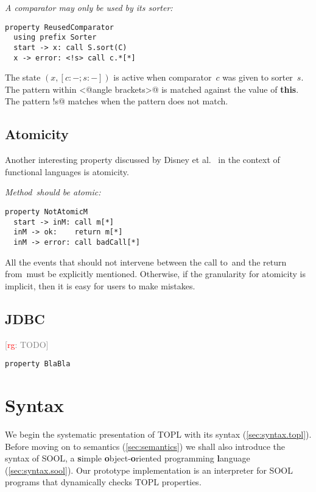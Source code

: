 \documentclass[preprint]{sigplanconf} %
\newcommand{\note}[2]{\textcolor{gray}{[\textcolor{red}{#1}: #2]}}
\newcommand{\rg}[1]{\note{rg}{#1}}
\newcommand{\delimitVerbatim}{\par\nobreak\smallskip\noindent}
\theoremstyle{definition}
\theoremstyle{remark}
\begin{document}
\medskip\emph{A comparator may only be used by its sorter:}
\delimitVerbatim
\begin{Verbatim}
property ReusedComparator
  using prefix Sorter
  start -> x: call S.sort(C)
  x -> error: <!s> call c.*[*]
\end{Verbatim}
\delimitVerbatim
The state $(x,[c:-;s:-])$ is active when comparator~$c$ was given to sorter~$s$.
The pattern within \Verb@<@angle brackets\Verb@>@ is matched against the value of \textbf{this}.
The pattern \Verb@!s@ matches when the pattern \Verb@s@ does not match.

\subsection{Atomicity} %

Another interesting property discussed by Disney et al.~\cite{disney2011} in the context of functional languages is atomicity.

\medskip\emph{Method~\Verb@m@ should be atomic:}
\delimitVerbatim
\begin{Verbatim}
property NotAtomicM
  start -> inM: call m[*]
  inM -> ok:    return m[*]
  inM -> error: call badCall[*]
\end{Verbatim}
\delimitVerbatim
All the events that should not intervene between the call to~\Verb@m@ and the return from~\Verb@m@ must be explicitly mentioned.
Otherwise, if the granularity for atomicity is implicit, then it is easy for users to make mistakes.

\subsection{JDBC} \label{sec:examples.jdbc} %

\rg{TODO}
\par\medskip\noindent
\begin{Verbatim}
property BlaBla
\end{Verbatim}

\section{Syntax}\label{sec:syntax} %

We begin the systematic presentation of TOPL with its syntax (\autoref{sec:syntax.topl}).
Before moving on to semantics (\autoref{sec:semantics}) we shall also introduce the syntax of SOOL, a \textbf simple \textbf object-\textbf oriented programming \textbf language (\autoref{sec:syntax.sool}).
Our prototype implementation is an interpreter for SOOL programs that dynamically checks TOPL properties.
\end{document}
